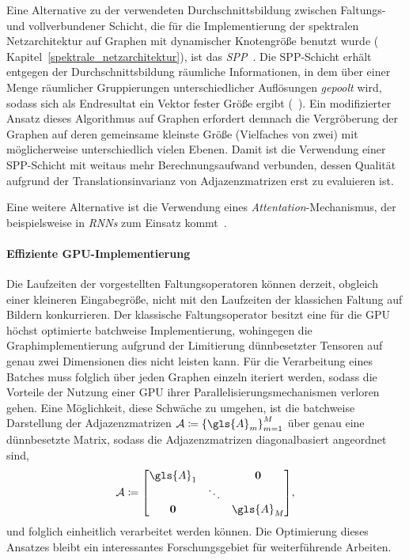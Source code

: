 Eine Alternative zu der verwendeten Durchschnittsbildung zwischen Faltungs- und vollverbundener Schicht, die für die Implementierung der spektralen Netzarchitektur auf Graphen mit dynamischer Knotengröße benutzt wurde (\vgl{} Kapitel~\ref{spektrale_netzarchitektur}), ist das \emph{\gls{SPP}}~\cite{spp}.
Die \gls{SPP}-Schicht erhält entgegen der Durchschnittsbildung räumliche Informationen, in dem über einer Menge räumlicher Gruppierungen unterschiedlicher Auflösungen \emph{gepoolt} wird, sodass sich als Endresultat ein Vektor fester Größe ergibt (\vgl{}~\cite{spp}).
Ein modifizierter Ansatz dieses Algorithmus auf Graphen erfordert demnach die Vergröberung der Graphen auf deren gemeinsame kleinste Größe (Vielfaches von zwei) mit möglicherweise unterschiedlich vielen Ebenen.
Damit ist die Verwendung einer \gls{SPP}-Schicht mit weitaus mehr Berechnungsaufwand verbunden, dessen Qualität aufgrund der Translationsinvarianz von Adjazenzmatrizen erst zu evaluieren ist.

Eine weitere Alternative ist die Verwendung eines \emph{Attentation}-Mechanismus, der beispielsweise in \emph{\glspl{RNN}} zum Einsatz kommt~\cite{attentation}.

\paragraph{Effiziente GPU-Implementierung}
\label{gpu_implementierung}

Die Laufzeiten der vorgestellten Faltungsoperatoren können derzeit, obgleich einer kleineren Eingabegröße, nicht mit den Laufzeiten der klassichen Faltung auf Bildern konkurrieren.
Der klassische Faltungsoperator besitzt eine für die GPU höchst optimierte batchweise Implementierung, wohingegen die Graphimplementierung aufgrund der Limitierung dünnbesetzter Tensoren auf genau zwei Dimensionen dies nicht leisten kann.
Für die Verarbeitung eines Batches muss folglich über jeden Graphen einzeln iteriert werden, sodass die Vorteile der Nutzung einer GPU \bzgl{} ihrer Parallelisierungsmechanismen verloren gehen.
Eine Möglichkeit, diese Schwäche zu umgehen, ist die batchweise Darstellung der Adjazenzmatrizen $\mathcal{A} \coloneqq {\left\{\gls{A}_m\right\}}_{m=1}^M$ über genau eine dünnbesetzte Matrix, sodass die Adjazenzmatrizen diagonalbasiert angeordnet sind, \dhe{}
\begin{equation*}
  \mathcal{A} \coloneqq \begin{bmatrix}
  \gls{A}_1 & & \ma{0}\\
  & \ddots & \\
  \ma{0} & & \gls{A}_M
  \end{bmatrix},
\end{equation*}
und folglich einheitlich verarbeitet werden können.
Die Optimierung dieses Ansatzes bleibt ein interessantes Forschungsgebiet für weiterführende Arbeiten.
